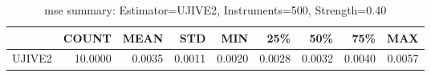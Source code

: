 \begin{table}[ht]
\centering
\caption{mse summary: Estimator=UJIVE2, Instruments=500, Strength=0.40}
\begin{tabular}{lrrrrrrrr}
\toprule
 & COUNT & MEAN & STD & MIN & 25\% & 50\% & 75\% & MAX \\
\midrule
UJIVE2 & 10.0000 & 0.0035 & 0.0011 & 0.0020 & 0.0028 & 0.0032 & 0.0040 & 0.0057 \\
\bottomrule
\end{tabular}
\end{table}
